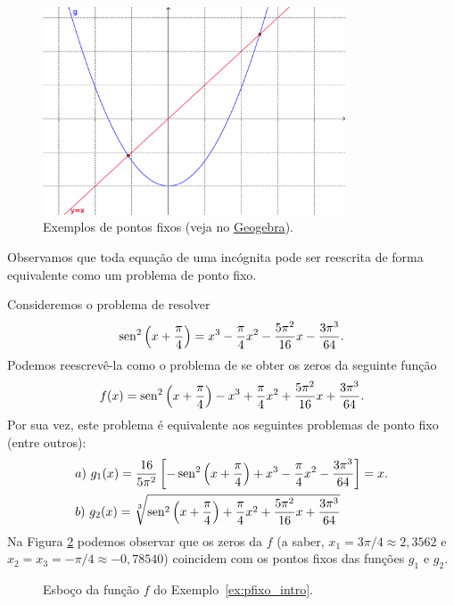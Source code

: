 \begin{figure}[h!]
  \centering
  \includegraphics[width=0.8\textwidth]{./cap_eq1d/dados/fig_pfixo/fig_pfixo}
  \caption{Exemplos de pontos fixos (veja no \href{https://github.com/phkonzen/notas/blob/master/src/MatematicaNumerica/cap_eq1d/dados/fig_pfixo/fig_pfixo.ggb}{Geogebra}).}
  \label{fig:pfixo}
\end{figure}

Observamos que toda equação de uma incógnita pode ser reescrita de forma equivalente como um problema de ponto fixo.

\begin{ex}\label{ex:pfixo_intro}
  Consideremos o problema de resolver
  \begin{equation}
    \operatorname{sen}^2\left(x+\frac{\pi}{4}\right) = x^3 - \frac{\pi}{4}x^2 - \frac{5\pi^2}{16}x - \frac{3\pi^3}{64}.
  \end{equation}
Podemos reescrevê-la como o problema de se obter os zeros da seguinte função
\begin{equation}
  f(x) = \operatorname{sen}^2\left(x+\frac{\pi}{4}\right) - x^3 + \frac{\pi}{4}x^2 + \frac{5\pi^2}{16}x + \frac{3\pi^3}{64}.
\end{equation}
Por sua vez, este problema é equivalente aos seguintes problemas de ponto fixo (entre outros):
\begin{align}
  &a)~g_1(x) = \frac{16}{5\pi^2}\left[-\operatorname{sen}^2\left(x+\frac{\pi}{4}\right) + x^3 - \frac{\pi}{4}x^2 - \frac{3\pi^3}{64}\right] = x.\\
  &b)~g_2(x) = \sqrt[3]{\operatorname{sen}^2\left(x+\frac{\pi}{4}\right) + \frac{\pi}{4}x^2 + \frac{5\pi^2}{16}x + \frac{3\pi^3}{64}}
\end{align}
Na Figura \ref{fig:pfixo_intro} podemos observar que os zeros da $f$ (a saber, $x_1=3\pi/4\approx 2,3562$ e $x_2=x_3=-\pi/4\approx -0,78540$) coincidem com os pontos fixos das funções $g_1$ e $g_2$.

\begin{figure}[h!]
  \centering
  \caption{Esboço da função $f$ do Exemplo~\ref{ex:pfixo_intro}.}
  \label{fig:pfixo_intro}
\end{figure}
\end{ex}

